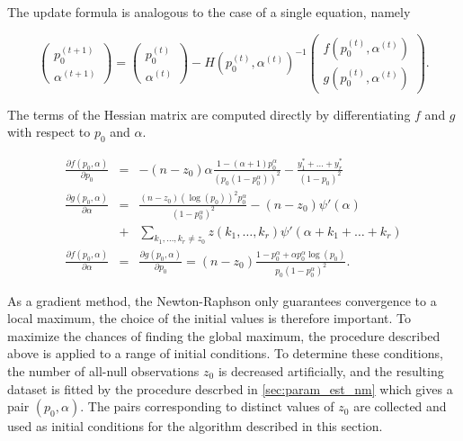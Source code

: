 \documentclass[12pt]{article}
\begin{document}
\begin{appendices}
    The update formula is analogous to the case of a single equation,
    namely

    \begin{equation*}
      \left(
        \begin{array}{ll} p_0^{(t+1)} \\
        \alpha^{(t+1)} \end{array} \right) =
      \left(
      \begin{array}{ll} p_0^{(t)} \\ \alpha^{(t)} \end{array} \right) -
        H(p_0^{(t)}, \alpha^{(t)})^{-1} \left(
      \begin{array}{ll} f(p_0^{(t)},\alpha^{(t)}) \\
      g(p_0^{(t)},\alpha^{(t)})
      \end{array} \right).
    \end{equation*}

    The terms of the Hessian matrix are computed directly by
    differentiating $f$ and $g$ with respect to $p_0$ and
    $\alpha$.

    \begin{eqnarray*}
      \frac{\partial f(p_0,\alpha)}{\partial p_0} &=&
      -(n-z_0)\alpha \frac{1-(\alpha+1)p_0^{\alpha}}
      {(p_0(1-p_0^{\alpha}))^2} - \frac{y_1^*+\ldots+y_r^*}
        {(1-p_0)^2} \\
      \frac{\partial g(p_0,\alpha)}{\partial \alpha} &=&
      \frac{(n-z_0)(\log(p_0))^2p_0^{\alpha}}
      {(1-p_0^{\alpha})^2} -(n-z_0)\psi'(\alpha) \\
      &+& \sum_{k_1,\ldots,k_r \neq z_0}z(k_1, \ldots, k_r)
      \psi'(\alpha+k_1+\ldots+k_r) \\
      \frac{\partial f(p_0,\alpha)}{\partial \alpha} &=&
      \frac{\partial g(p_0,\alpha)}{\partial p_0} =
      (n-z_0)\frac{1-p_0^{\alpha}+\alpha p_0^{\alpha} \log(p_0)}
      {p_0(1-p_0^{\alpha})^2}.
    \end{eqnarray*}

    As a gradient method, the Newton-Raphson only guarantees
    convergence to a local maximum, the choice of the initial values
    is therefore important. To maximize the chances of finding the
    global maximum, the procedure described above is applied to
    a range of initial conditions. To determine these conditions,
    the number of all-null observations $z_0$ is decreased
    artificially, and the resulting dataset is fitted by the
    procedure descrbed in \ref{sec:param_est_nm} which gives a pair
    $(p_0, \alpha)$. The pairs corresponding to distinct values of
    $z_0$ are collected and used as initial conditions for the
    algorithm described in this section.


\end{appendices}
\end{document}
